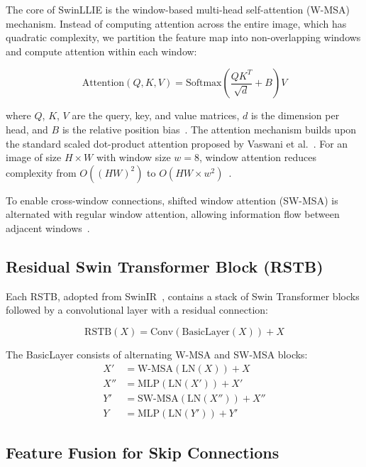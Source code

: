 \documentclass[conference]{IEEEtran}
\begin{document}
The core of SwinLLIE is the window-based multi-head self-attention (W-MSA) mechanism. Instead of computing attention across the entire image, which has quadratic complexity, we partition the feature map into non-overlapping windows and compute attention within each window:

\begin{equation}
\text{Attention}(Q, K, V) = \text{Softmax}\left(\frac{QK^T}{\sqrt{d}} + B\right)V
\end{equation}

where $Q$, $K$, $V$ are the query, key, and value matrices, $d$ is the dimension per head, and $B$ is the relative position bias~\cite{liu2021swin}. The attention mechanism builds upon the standard scaled dot-product attention proposed by Vaswani et al.~\cite{vaswani2017attention}. For an image of size $H \times W$ with window size $w = 8$, window attention reduces complexity from $O((HW)^2)$ to $O(HW \times w^2)$~\cite{liu2021swin}.

To enable cross-window connections, shifted window attention (SW-MSA) is alternated with regular window attention, allowing information flow between adjacent windows~\cite{liu2021swin}.

\subsection{Residual Swin Transformer Block (RSTB)}

Each RSTB, adopted from SwinIR~\cite{liang2021swinir}, contains a stack of Swin Transformer blocks followed by a convolutional layer with a residual connection:

\begin{equation}
\text{RSTB}(X) = \text{Conv}(\text{BasicLayer}(X)) + X
\end{equation}

The BasicLayer consists of alternating W-MSA and SW-MSA blocks:
\begin{equation}
\begin{aligned}
X' &= \text{W-MSA}(\text{LN}(X)) + X \\
X'' &= \text{MLP}(\text{LN}(X')) + X' \\
Y' &= \text{SW-MSA}(\text{LN}(X'')) + X'' \\
Y &= \text{MLP}(\text{LN}(Y')) + Y'
\end{aligned}
\end{equation}

\subsection{Feature Fusion for Skip Connections}
\end{document}

